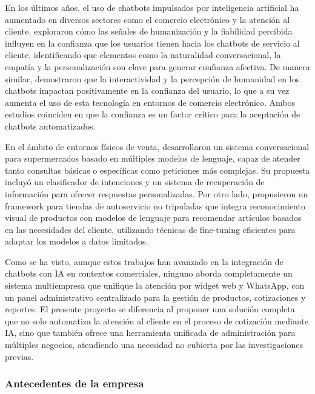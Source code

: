 En los últimos años, el uso de chatbots impulsados por inteligencia artificial ha aumentado en diversos sectores como el comercio electrónico y la atención al cliente. \cite{wang2026building} exploraron cómo las señales de humanización y la fiabilidad percibida influyen en la confianza que los usuarios tienen hacia los chatbots de servicio al cliente, identificando que elementos como la naturalidad conversacional, la empatía y la personalización son clave para generar confianza afectiva. De manera similar, \cite{ding2024interactivity} demostraron que la interactividad y la percepción de humanidad en los chatbots impactan positivamente en la confianza del usuario, lo que a su vez aumenta el uso de esta tecnología en entornos de comercio electrónico. Ambos estudios coinciden en que la confianza es un factor crítico para la aceptación de chatbots automatizados.

En el ámbito de entornos físicos de venta, \cite{nandkumar2025enhancing} desarrollaron un sistema conversacional para supermercados basado en múltiples modelos de lenguaje, capaz de atender tanto consultas básicas o específicas como peticiones más complejas. Su propuesta incluyó un clasificador de intenciones y un sistema de recuperación de información para ofrecer respuestas personalizadas. Por otro lado, \cite{wang2024smart} propusieron un framework para tiendas de autoservicio no tripuladas que integra reconocimiento visual de productos con modelos de lenguaje para recomendar artículos basados en las necesidades del cliente, utilizando técnicas de fine-tuning eficientes para adaptar los modelos a datos limitados.

Como se ha visto, aunque estos trabajos han avanzado en la integración de chatbots con IA en contextos comerciales, ninguno aborda completamente un sistema multiempresa que unifique la atención por widget web y WhatsApp, con un panel administrativo centralizado para la gestión de productos, cotizaciones y reportes. El presente proyecto se diferencia al proponer una solución completa que no solo automatiza la atención al cliente en el proceso de cotización mediante IA, sino que también ofrece una herramienta unificada de administración para múltiples negocios, atendiendo una necesidad no cubierta por las investigaciones previas.

\subsubsection{Antecedentes de la empresa}
\label{subsec:antecedentes_de_la_empresa}

